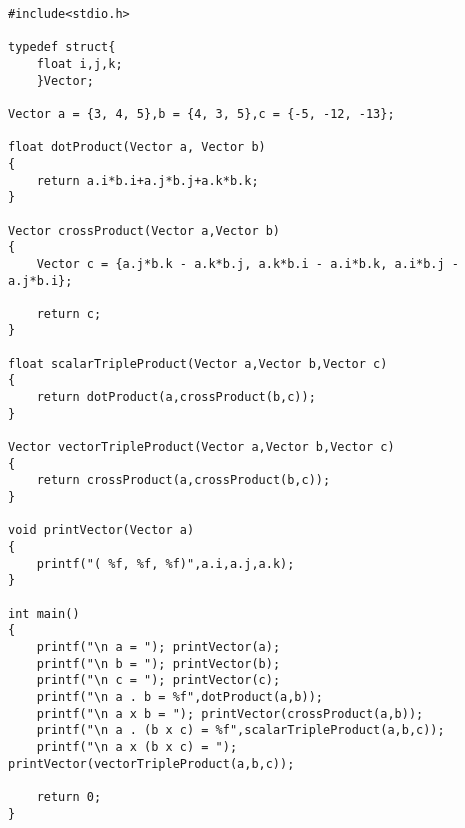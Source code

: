 \documentclass[twoside,10.5pt]{article}%
\begin{document}
\vspace{0.3cm}

\begin{verbatim}
#include<stdio.h>
 
typedef struct{
	float i,j,k;
	}Vector;
 
Vector a = {3, 4, 5},b = {4, 3, 5},c = {-5, -12, -13};
 
float dotProduct(Vector a, Vector b)
{
	return a.i*b.i+a.j*b.j+a.k*b.k;
}
 
Vector crossProduct(Vector a,Vector b)
{
	Vector c = {a.j*b.k - a.k*b.j, a.k*b.i - a.i*b.k, a.i*b.j - a.j*b.i};
 
	return c;
}
 
float scalarTripleProduct(Vector a,Vector b,Vector c)
{
	return dotProduct(a,crossProduct(b,c));
}
 
Vector vectorTripleProduct(Vector a,Vector b,Vector c)
{
	return crossProduct(a,crossProduct(b,c));
}
 
void printVector(Vector a)
{
	printf("( %f, %f, %f)",a.i,a.j,a.k);
}
 
int main()
{
	printf("\n a = "); printVector(a);
	printf("\n b = "); printVector(b);
	printf("\n c = "); printVector(c);
	printf("\n a . b = %f",dotProduct(a,b));
	printf("\n a x b = "); printVector(crossProduct(a,b));
	printf("\n a . (b x c) = %f",scalarTripleProduct(a,b,c));
	printf("\n a x (b x c) = "); printVector(vectorTripleProduct(a,b,c));
 
	return 0;
}
\end{verbatim}
\end{document}

